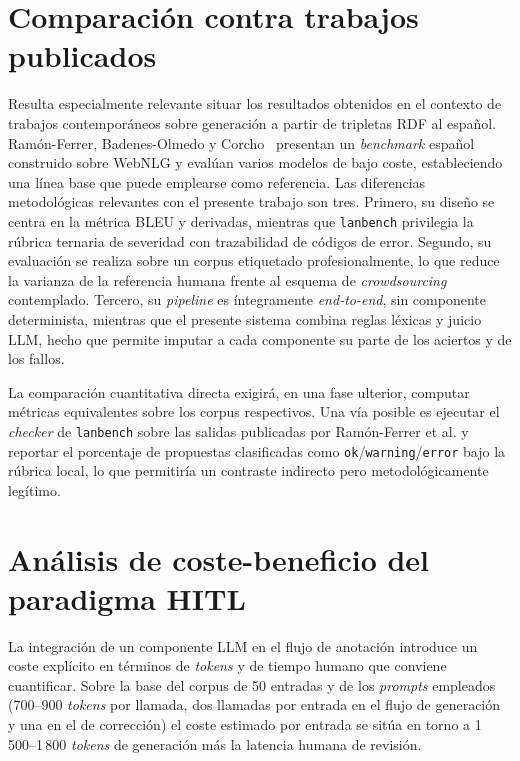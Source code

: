 \section{Comparación contra trabajos publicados}
\label{sec:comparacion-publicados}

Resulta especialmente relevante situar los resultados obtenidos en el contexto
de trabajos contemporáneos sobre generación a partir de tripletas RDF al
español. Ramón-Ferrer, Badenes-Olmedo y Corcho~\cite{RamonFerrer2025} presentan
un \textit{benchmark} español construido sobre WebNLG y evalúan varios modelos
de bajo coste, estableciendo una línea base que puede emplearse como
referencia. Las diferencias metodológicas relevantes con el presente trabajo
son tres. Primero, su diseño se centra en la métrica BLEU y derivadas, mientras
que \texttt{lanbench} privilegia la rúbrica ternaria de severidad con
trazabilidad de códigos de error. Segundo, su evaluación se realiza sobre un
corpus etiquetado profesionalmente, lo que reduce la varianza de la referencia
humana frente al esquema de \textit{crowdsourcing} contemplado. Tercero, su
\textit{pipeline} es íntegramente \textit{end-to-end}, sin componente
determinista, mientras que el presente sistema combina reglas léxicas y juicio
LLM, hecho que permite imputar a cada componente su parte de los aciertos y de
los fallos.

La comparación cuantitativa directa exigirá, en una fase ulterior, computar
métricas equivalentes sobre los corpus respectivos. Una vía posible es ejecutar
el \textit{checker} de \texttt{lanbench} sobre las salidas publicadas por
Ramón-Ferrer et al. y reportar el porcentaje de propuestas clasificadas como
\texttt{ok}/\texttt{warning}/\texttt{error} bajo la rúbrica local, lo que
permitiría un contraste indirecto pero metodológicamente legítimo.

\section{Análisis de coste-beneficio del paradigma HITL}
\label{sec:coste-hitl}

La integración de un componente LLM en el flujo de anotación introduce un coste
explícito en términos de \textit{tokens} y de tiempo humano que conviene
cuantificar. Sobre la base del corpus de 50 entradas y de los \textit{prompts}
empleados (700--900 \textit{tokens} por llamada, dos llamadas por entrada en el
flujo de generación y una en el de corrección) el coste estimado por entrada se
sitúa en torno a 1\,500--1\,800 \textit{tokens} de generación más la latencia
humana de revisión.

